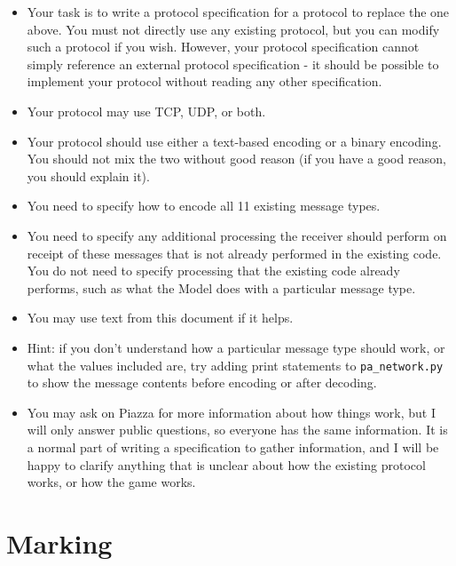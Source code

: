\documentclass{article}
\begin{document}
\begin{itemize}
\item Your task is to write a protocol specification for a protocol to
replace the one above.  You must not directly use any existing
protocol, but you can modify such a protocol if you wish.  However,
your protocol specification cannot simply reference an external
protocol specification - it should be possible to implement your
protocol without reading any other specification.

\item Your protocol may use TCP, UDP, or both.

\item Your protocol should use either a text-based encoding or a binary
encoding.  You should not mix the two without good reason (if you have
a good reason, you should explain it).

\item You need to specify how to encode all 11 existing message
types.

\item You need to specify any additional processing the receiver should
perform on receipt of these messages that is not already performed in
the existing code.  You do not need to specify processing that the
existing code already performs, such as what the Model does with a
particular message type.

\item You may use text from this document if it helps.

\item Hint: if you don't understand how a particular message type
  should work, or what the values included are, try adding print
  statements to {\tt pa\_network.py} to show the message contents
  before encoding or after decoding.

\item You may ask on Piazza for more information about how things
  work, but I will only answer public questions, so everyone has the
  same information.  It is a normal part of writing a specification to
  gather information, and I will be happy to clarify anything that is
  unclear about how the existing protocol works, or how the game
  works.
\end{itemize}

\newpage
\section{Marking}
\end{document}
